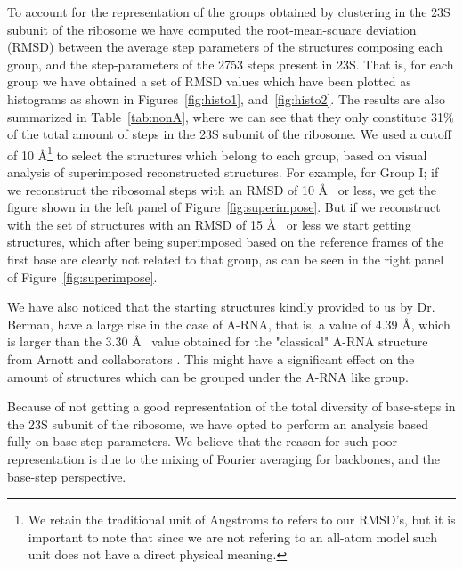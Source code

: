To account for the representation of the groups obtained by clustering
in   the  23S   subunit  of   the  ribosome   we  have   computed  the
root-mean-square deviation (RMSD)  between the average step parameters
of the structures composing each group, and the step-parameters of the
2753 steps present in 23S.  That is, for each group we have obtained a
set of RMSD  values which have been plotted as  histograms as shown in
Figures~\ref{fig:histo1}, and~\ref{fig:histo2}.   The results are also
summarized in  Table~\ref{tab:nonA}, where we  can see that  they only
constitute 31\% of the total amount of steps in the 23S subunit of the
ribosome.   We  used  a  cutoff  of 10  \AA  \footnote{We  retain  the
  traditional unit  of Angstroms  to refers to  our RMSD's, but  it is
  important  to note that  since we  are not  refering to  an all-atom
  model such unit does not  have a direct physical meaning.} to select
the structures which belong to each group, based on visual analysis of
superimposed reconstructed structures. For example, for Group I; if we
reconstruct the ribosomal steps with an RMSD of 10 \AA~ or less, we get
the      figure      shown     in      the      left     panel      of
Figure~\ref{fig:superimpose}. But  if we  reconstruct with the  set of
structures with an RMSD of 15 \AA~ or less we start getting structures,
which after  being superimposed based  on the reference frames  of the
first base  are clearly not related to  that group, as can  be seen in
the right panel of Figure~\ref{fig:superimpose}.

We have also  noticed that the starting structures  kindly provided to
us by Dr. Berman,  have a large rise in the case  of A-RNA, that is, a
value of  4.39 \AA, which is  larger than the 3.30  \AA~ value obtained
for  the "classical"  A-RNA  structure from  Arnott and  collaborators
\cite{arnott1973}. This might have  a significant effect on the amount
of structures which can be grouped under the A-RNA like group.

Because of not getting a good representation of the total diversity of
base-steps  in the  23S  subunit of  the  ribosome, we  have opted  to
perform an  analysis based fully  on base-step parameters.  We believe
that the reason  for such poor representation is due  to the mixing of
Fourier averaging for backbones, and  the base-step perspective.

